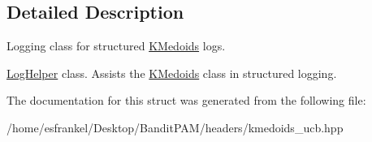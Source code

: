 \subsection{Detailed Description}
Logging class for structured \hyperlink{classKMedoids}{K\+Medoids} logs. 

\hyperlink{structLogHelper}{Log\+Helper} class. Assists the \hyperlink{classKMedoids}{K\+Medoids} class in structured logging. 

The documentation for this struct was generated from the following file\+:\begin{DoxyCompactItemize}
\item 
/home/esfrankel/\+Desktop/\+Bandit\+P\+A\+M/headers/kmedoids\+\_\+ucb.\+hpp\end{DoxyCompactItemize}
